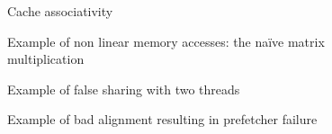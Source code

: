 \begin{figure}[htb]
    \centering
    \caption{Cache associativity}
    \label{fig:cache-assoc}
\end{figure}


\begin{figure}[htb]
    \centering
    \caption{Example of non linear memory accesses: the naïve matrix multiplication}
    \label{fig:mat-mult}
\end{figure}

\begin{figure}[htb]
    \centering
    \caption{Example of false sharing with two threads}
    \label{fig:false-sharing}
\end{figure}

\begin{figure}[htb]
    \centering
    \caption{Example of bad alignment resulting in prefetcher failure}
    \label{fig:bad-align}
\end{figure}

